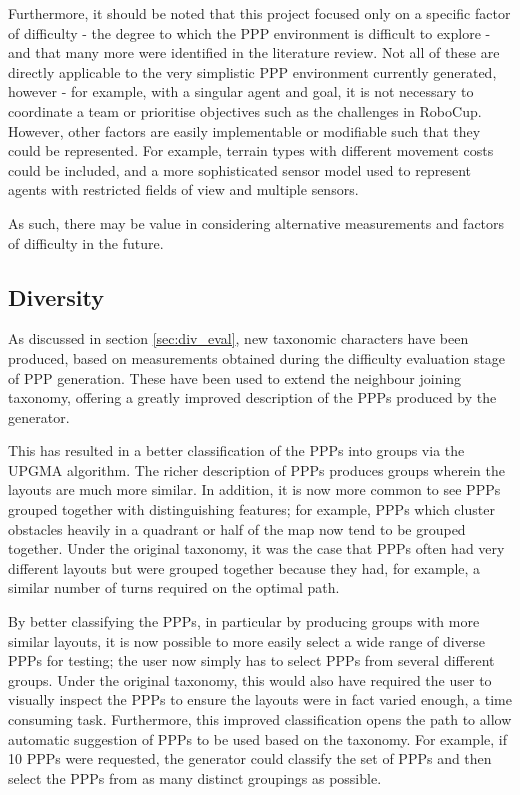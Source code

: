 \documentclass[authoryearcitations]{UoYCSproject}
\begin{document}
Furthermore, it should be noted that this project focused only on a specific factor of difficulty - the degree to which the PPP environment is difficult to explore - and that many more were identified in the literature review. Not all of these are directly applicable to the very simplistic PPP environment currently generated, however - for example, with a singular agent and goal, it is not necessary to coordinate a team or prioritise objectives such as the challenges in RoboCup. However, other factors are easily implementable or modifiable such that they could be represented. For example, terrain types with different movement costs could be included, and a more sophisticated sensor model used to represent agents with restricted fields of view and multiple sensors.

As such, there may be value in considering alternative measurements and factors of difficulty in the future.

\subsection{Diversity}
\label{sec:conc_div}

As discussed in section \ref{sec:div_eval}, new taxonomic characters have been produced, based on measurements obtained during the difficulty evaluation stage of PPP generation. These have been used to extend the neighbour joining taxonomy, offering a greatly improved description of the PPPs produced by the generator.

This has resulted in a better classification of the PPPs into groups via the UPGMA algorithm. The richer description of PPPs produces groups wherein the layouts are much more similar. In addition, it is now more common to see PPPs grouped together with distinguishing features; for example, PPPs which cluster obstacles heavily in a quadrant or half of the map now tend to be grouped together. Under the original taxonomy, it was the case that PPPs often had very different layouts but were grouped together because they had, for example, a similar number of turns required on the optimal path.

By better classifying the PPPs, in particular by producing groups with more similar layouts, it is now possible to more easily select a wide range of diverse PPPs for testing; the user now simply has to select PPPs from several different groups. Under the original taxonomy, this would also have required the user to visually inspect the PPPs to ensure the layouts were in fact varied enough, a time consuming task. Furthermore, this improved classification opens the path to allow automatic suggestion of PPPs to be used based on the taxonomy. For example, if 10 PPPs were requested, the generator could classify the set of PPPs and then select the PPPs from as many distinct groupings as possible.
\end{document}
